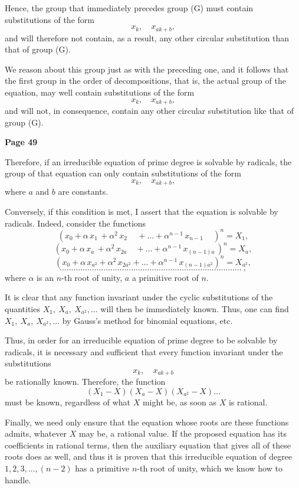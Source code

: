 \documentclass{article}
\begin{document}
Hence, the group that immediately precedes group (G) must contain substitutions of the form
\[
x_k,\quad x_{a k + b},
\]
and will therefore not contain, as a result, any other circular substitution than that of group (G).

We reason about this group just as with the preceding one, and it follows that the first group in the order of decompositions, that is, the actual group of the equation, may well contain substitutions of the form
\[
x_k,\quad x_{a k + b},
\]
and will not, in consequence, contain any other circular substitution like that of group (G).



\newpage

\centerline{\textbf{Page 49}}

\medskip

Therefore, if an irreducible equation of prime degree is solvable by radicals, the group of that equation can only contain substitutions of the form
\[x_k,\quad x_{a k + b},\]
where $a$ and $b$ are constants.

Conversely, if this condition is met, I assert that the equation is solvable by radicals. Indeed, consider the functions
\[
(x_0 + \alpha\, x_1\, + \alpha^2\, x_2\,\quad + \dots + \alpha^{n-1}\, x_{n-1} \,\quad )^n = X_1,
\]
\[
(x_0 + \alpha\, x_a\, + \alpha^{2}\, x_{2a}\quad + \dots + \alpha^{n-1}\, x_{(n-1)a}\, )^n = X_a,
\]
\[
(x_0 + \alpha\, x_{a^2} + \alpha^2\, x_{2a^2} + \dots + \alpha^{n-1}\, x_{(n-1)a^2} )^n = X_{a^2},
\]
\[
...............................................................................\ ,
\]
where $\alpha$ is an $n$-th root of unity, $a$ a primitive root of $n$.

It is clear that any function invariant under the cyclic substitutions of the quantities $X_1,\ X_a,\ X_{a^2},\dots$ will then be immediately known. Thus, one can find $X_1,\ X_a,\ X_{a^2},\dots$ by Gauss’s method for binomial equations, etc.

Thus, in order for an irreducible equation of prime degree to be solvable by radicals, it is necessary and sufficient that every function invariant under the substitutions
\[
x_k,\quad x_{a k + b}
\]
be rationally known. Therefore, the function
\[
(X_1 - X)(X_{a} - X)(X_{a^2} - X)\dots
\]
must be known, regardless of what $X$ might be, as soon as $X$ is rational.

Finally, we need only ensure that the equation whose roots are these functions admits, whatever $X$ may be, a rational value. If the proposed equation has its coefficients in rational terms, then the auxiliary equation that gives all of these roots does as well, and thus it is proven that this irreducible equation of degree $1,2,3,\dots,(n-2)$ has a primitive $n$-th root of unity, which we know how to handle.
\end{document}
